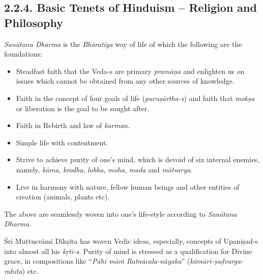 \newpage

\subsection*{2.2.4. Basic Tenets of Hinduism – Religion and Philosophy}

\textit{Sanātana Dharma} is the \textit{Bhāratīya} way of life of which the following are the foundations:

\vspace{-.4cm}

\begin{itemize}
\itemsep=0pt

 \item Steadfast faith that the Veda-s are primary \textit{pramāṇa} and enlighten us on issues which cannot be obtained from any other sources of knowledge.

 \item Faith in the concept of four goals of life (\textit{puruṣārtha-s}) and faith that \textit{mokṣa} or liberation is the goal to be sought after.

 \item Faith in Rebirth and law of \textit{karman.}

 \item Simple life with contentment.

 \item Strive to achieve purity of one’s mind, which is devoid of six internal enemies, namely, \textit{kāma}, \textit{krodha}, \textit{lobha}, \textit{moha}, \textit{mada} and \textit{mātsarya.}

 \item Live in harmony with nature, fellow human beings and other entities of creation (animals, plants etc).

\end{itemize}

\vspace{-.4cm}

The above are seamlessly woven into one’s life-style according to \textit{Sanātana Dharma}.

Śri Muttusvāmi Dīkṣita has woven Vedic ideas, especially, concepts of Upaniṣad-s into almost all his \textit{kṛti-s}. Purity of mind is stressed as a qualification for Divine grace, in compositions like “\textit{Pāhi māṁ Ratnācala-nāyaka}” (\textit{kāmāri-ṣaḍvarga-rahita}) etc.

